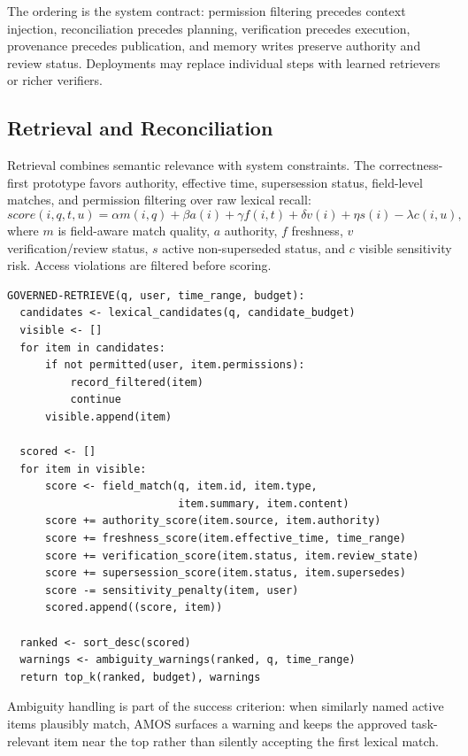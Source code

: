 \documentclass[10pt]{article}
\newcommand{\amos}{\textsc{AMOS}\xspace}
\begin{document}
The ordering is the system contract: permission filtering precedes context injection, reconciliation precedes planning, verification precedes execution, provenance precedes publication, and memory writes preserve authority and review status. Deployments may replace individual steps with learned retrievers or richer verifiers.

\subsection{Retrieval and Reconciliation}
Retrieval combines semantic relevance with system constraints. The correctness-first prototype favors authority, effective time, supersession status, field-level matches, and permission filtering over raw lexical recall:
\begin{equation}
    score(i,q,t,u) = \alpha m(i,q) + \beta a(i) + \gamma f(i,t) + \delta v(i) + \eta s(i) - \lambda c(i,u),
\end{equation}
where $m$ is field-aware match quality, $a$ authority, $f$ freshness, $v$ verification/review status, $s$ active non-superseded status, and $c$ visible sensitivity risk. Access violations are filtered before scoring.

\begin{verbatim}
GOVERNED-RETRIEVE(q, user, time_range, budget):
  candidates <- lexical_candidates(q, candidate_budget)
  visible <- []
  for item in candidates:
      if not permitted(user, item.permissions):
          record_filtered(item)
          continue
      visible.append(item)

  scored <- []
  for item in visible:
      score <- field_match(q, item.id, item.type,
                           item.summary, item.content)
      score += authority_score(item.source, item.authority)
      score += freshness_score(item.effective_time, time_range)
      score += verification_score(item.status, item.review_state)
      score += supersession_score(item.status, item.supersedes)
      score -= sensitivity_penalty(item, user)
      scored.append((score, item))

  ranked <- sort_desc(scored)
  warnings <- ambiguity_warnings(ranked, q, time_range)
  return top_k(ranked, budget), warnings
\end{verbatim}

Ambiguity handling is part of the success criterion: when similarly named active items plausibly match, \amos surfaces a warning and keeps the approved task-relevant item near the top rather than silently accepting the first lexical match.
\end{document}
